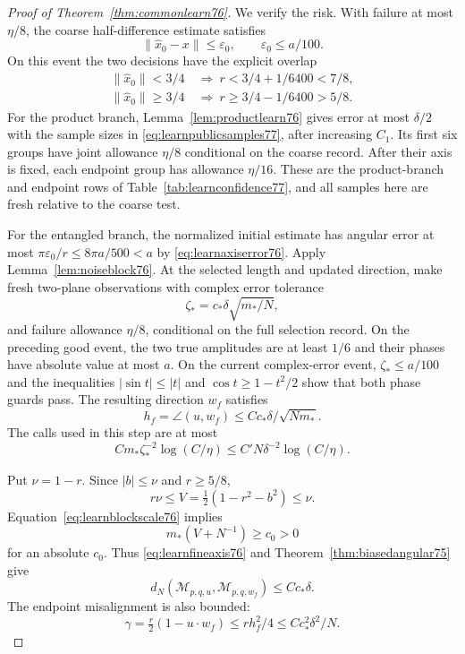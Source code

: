 \begin{proof}[Proof of Theorem~\ref{thm:commonlearn76}]
We verify the risk.  With failure at most $\eta/8$, the coarse
half-difference estimate satisfies
\[
 \|\widehat x_0-x\|\le\varepsilon_0,
 \qquad \varepsilon_0\le a/100.
\]
On this event the two decisions have the explicit overlap
\[
\begin{aligned}
 \|\widehat x_0\|<3/4
       &\ \Longrightarrow\ r<3/4+1/6400<7/8,\\
 \|\widehat x_0\|\ge3/4
       &\ \Longrightarrow\ r\ge3/4-1/6400>5/8.
\end{aligned}
\]
For the product branch, Lemma~\ref{lem:productlearn76} gives error
at most $\delta/2$ with the sample sizes in
\eqref{eq:learnpublicsamples77}, after increasing $C_1$.
Its first six groups have joint allowance $\eta/8$ conditional on
the coarse record.  After their axis is fixed, each endpoint group
has allowance $\eta/16$.  These are the product-branch and endpoint
rows of Table~\ref{tab:learnconfidence77}, and all samples here are
fresh relative to the coarse test.

For the entangled branch, the normalized initial estimate has
angular error at most
$\pi\varepsilon_0/r\le8\pi a/500<a$ by
\eqref{eq:learnaxiserror76}.  Apply Lemma~\ref{lem:noiseblock76}.
At the selected length and updated direction, make fresh
two-plane observations with complex error tolerance
\begin{equation}\label{eq:learnfinetolerance76}
 \zeta_*=c_*\delta\sqrt{m_*/N},
\end{equation}
and failure allowance $\eta/8$, conditional on the full selection
record.  On the preceding good event, the two true amplitudes are
at least $1/6$ and their phases have absolute value at most $a$.
On the current complex-error event, $\zeta_*\le a/100$ and the inequalities
$|\sin t|\le|t|$ and $\cos t\ge1-t^2/2$ show that both phase
guards pass.  The resulting direction $w_f$
satisfies
\begin{equation}\label{eq:learnfineaxis76}
 h_f=\angle(u,w_f)
       \le Cc_*\delta/\sqrt{Nm_*}.
\end{equation}
The calls used in this step are at most
\begin{equation}\label{eq:learnfinecost76}
 Cm_*\zeta_*^{-2}\log(C/\eta)
       \le C'N\delta^{-2}\log(C/\eta).
\end{equation}

Put $\nu=1-r$.  Since $|b|\le\nu$ and $r\ge5/8$,
\[
 r\nu\le V=\tfrac12(1-r^2-b^2)\le\nu.
\]
Equation~\eqref{eq:learnblockscale76} implies
\begin{equation}\label{eq:learnblockvariance76}
 m_*(V+N^{-1})\ge c_0>0
\end{equation}
for an absolute $c_0$.  Thus \eqref{eq:learnfineaxis76} and
Theorem~\ref{thm:biasedangular75} give
\begin{equation}\label{eq:learnhighangle76}
 d_N(\mathcal M_{p,q,u},\mathcal M_{p,q,w_f})
       \le Cc_*\delta.
\end{equation}
The endpoint misalignment is also bounded:
\begin{equation}\label{eq:learnhighgamma76}
 \gamma=\tfrac r2(1-u\cdot w_f)
       \le rh_f^2/4\le Cc_*^2\delta^2/N.
\end{equation}


\end{proof}

